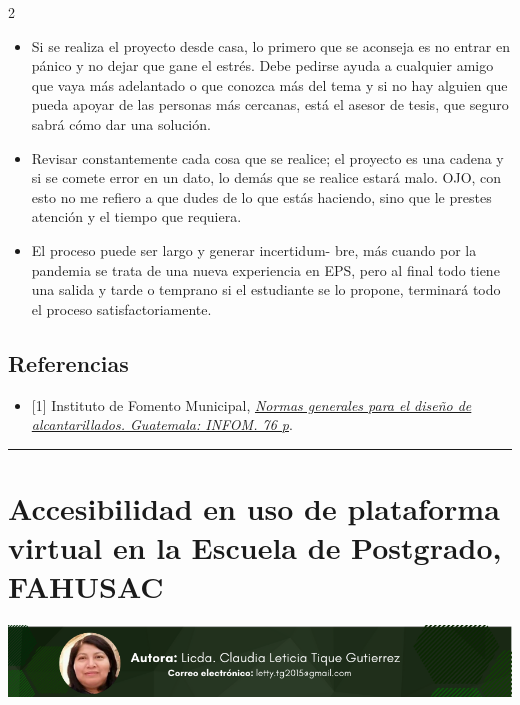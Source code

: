 \documentclass[12pt,spanish,Letterpaper,openany]{book}
\providecommand{\tightlist}{%
  \setlength{\itemsep}{0pt}\setlength{\parskip}{0pt}}
\newcommand{\HRule}{\begin{center}\rule{0.5\linewidth}{0.2mm}\end{center}}
\begin{document}
\begin {multicols}{2}
\begin{itemize}
\item
  Si se realiza el proyecto desde casa, lo primero que se aconseja es no entrar en pánico y no dejar que gane el estrés. Debe pedirse ayuda a cualquier amigo que vaya más adelantado o que conozca más del tema y si no hay alguien que pueda apoyar de las personas más cercanas, está el asesor de tesis, que seguro sabrá cómo dar una solución.
\item
  Revisar constantemente cada cosa que se realice; el proyecto es una cadena y si se comete error en un dato, lo demás que se realice estará malo. OJO, con esto no me refiero a que dudes de lo que estás haciendo, sino que le prestes atención y el tiempo que requiera.
\item
  El proceso puede ser largo y generar incertidum-
  bre, más cuando por la pandemia se trata de una nueva experiencia en EPS, pero al final todo tiene una salida y tarde o temprano si el estudiante se lo propone, terminará todo el proceso satisfactoriamente.
\end{itemize}

\hypertarget{referencias-1}{%
\section{Referencias}\label{referencias-1}}

\begin{itemize}
\tightlist
\item
  {[}1{]} Instituto de Fomento Municipal, \href{https://bit.ly/39x9Bc5}{\emph{Normas generales para el diseño de alcantarillados. Guatemala: INFOM. 76 p}}.
\end{itemize}

\end {multicols}

\medskip

\HRule

\medskip

\hypertarget{article08}{%
\chapter{Accesibilidad en uso de plataforma virtual en la Escuela de Postgrado, FAHUSAC}\label{article08}}

\begin{center}\includegraphics[width=1\linewidth]{images/claudia} \end{center}
\end{document}
